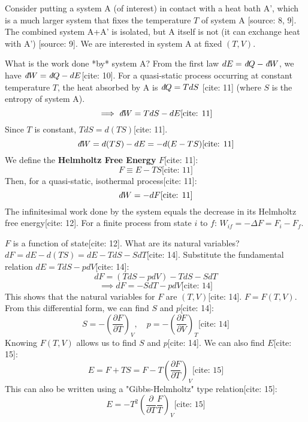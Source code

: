 \documentclass[11pt]{article}
\newcommand{\pderiv}[2]{\frac{\partial #1}{\partial #2}}
\newcommand{\ethbar}{\text{\it{đ}}} %
\begin{document}
Consider putting a system A (of interest) in contact with a heat bath A', which is a much larger system that fixes the temperature $T$ of system A [source: 8, 9]. The combined system A+A' is isolated, but A itself is not (it can exchange heat with A') [source: 9]. We are interested in system A at fixed $(T,V)$.

\begin{center}
\end{center}

What is the work done *by* system A? From the first law $dE = \ethbar Q - \ethbar W$, we have $\ethbar W = \ethbar Q - dE$[cite: 10].
For a quasi-static process occurring at constant temperature $T$, the heat absorbed by A is $\ethbar Q = T dS$ [cite: 11] (where $S$ is the entropy of system A).
\[ \implies \ethbar W = T dS - dE \text{[cite: 11]} \]
Since $T$ is constant, $T dS = d(TS)$[cite: 11].
\[ \ethbar W = d(TS) - dE = - d(E - TS) \text{[cite: 11]} \]
We define the \textbf{Helmholtz Free Energy} $F$[cite: 11]:
\[ F \equiv E - TS \text{[cite: 11]} \]
Then, for a quasi-static, isothermal process[cite: 11]:
\[ \ethbar W = -dF \text{[cite: 11]} \]
The infinitesimal work done by the system equals the decrease in its Helmholtz free energy[cite: 12].
For a finite process from state $i$ to $f$: $W_{if} = -\Delta F = F_i - F_f$.

$F$ is a function of state[cite: 12]. What are its natural variables?
$dF = dE - d(TS) = dE - T dS - S dT$[cite: 14].
Substitute the fundamental relation $dE = T dS - p dV$[cite: 14]:
\[ dF = (T dS - p dV) - T dS - S dT \]
\[ \implies dF = -S dT - p dV \text{[cite: 14]} \]
This shows that the natural variables for $F$ are $(T, V)$[cite: 14]. $F = F(T,V)$.
From this differential form, we can find $S$ and $p$[cite: 14]:
\[ S = - \left( \pderiv{F}{T} \right)_V, \quad p = - \left( \pderiv{F}{V} \right)_T \text{[cite: 14]} \]
Knowing $F(T,V)$ allows us to find $S$ and $p$[cite: 14]. We can also find $E$[cite: 15]:
\[ E = F + TS = F - T \left( \pderiv{F}{T} \right)_V \text{[cite: 15]} \]
This can also be written using a "Gibbs-Helmholtz" type relation[cite: 15]:
\[ E = -T^2 \left( \pderiv{}{T} \frac{F}{T} \right)_V \text{[cite: 15]} \]
\end{document}
